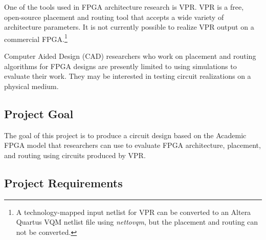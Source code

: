 One of the tools used in FPGA architecture research is VPR.
VPR is a free, open-source placement and routing tool that accepts a wide variety of architecture parameters. \citationneeded
It is not currently possible to realize VPR output on a commercial FPGA.\footnote{A technology-mapped input netlist for VPR can be converted to an Altera Quartus VQM netlist file using \emph{nettovqm}\cite{nettovqm}, but the placement and routing can not be converted.}

Computer Aided Design (CAD) researchers who work on placement and routing algorithms for FPGA designs are presently limited to using simulations to evaluate their work.
They may be interested in testing circuit realizations on a physical medium.



\subsection{Project Goal}

% 

The goal of this project is to produce a circuit design based on the Academic FPGA model that researchers can use to evaluate FPGA architecture, placement, and routing using circuits produced by VPR.



\subsection{Project Requirements}


